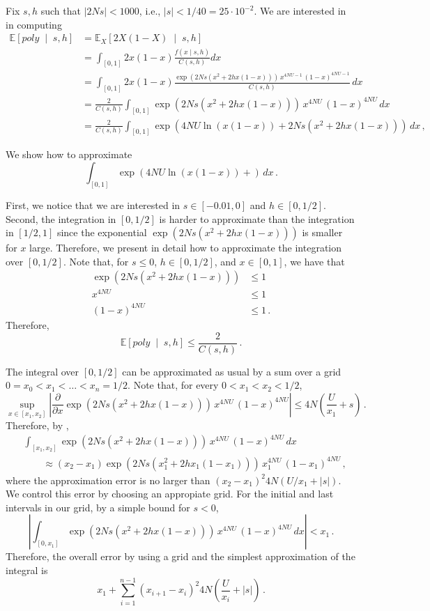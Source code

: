 \documentclass[a4paper,11pt]{article}
\newcommand{\EE}{\mathbb{E}}
\newcommand{\1}{\mathds{1}}
\newcommand{\cond}{\;\middle\vert\;}
\theoremstyle{plain} %
\theoremstyle{definition} %
\theoremstyle{remark} %
\begin{document}
Fix $s, h$ such that $|2Ns| < 1000$, i.e., $|s| < 1/40 = 25 \cdot 10^{-2}$. 
We are interested in in computing
\begin{align*}
	\EE \left[ poly \cond s, h \right] 
		&= \EE_X \left[ 2 X (1 - X) \cond s, h \right] \\
		&= \int_{[0, 1]} 2 x (1 - x) \frac{ f(x \mid s, h) }{ C(s, h) } dx \\
		&= \int_{[0, 1]}  2 x (1 - x) \frac{ \exp( 2 N s ( x^2 + 2h x(1-x) ) ) \, x^{4 N U - 1} \, (1 - x)^{4 N U - 1} }{ C(s, h) } \, dx \\
		&= \frac{2}{C(s, h)} \int_{[0, 1]}  \exp( 2 N s ( x^2 + 2h x(1-x)) ) \, x^{4 N U} \, (1 - x)^{4 N U} \, dx \\
		&= \frac{2}{C(s, h)} \int_{[0, 1]}  \exp( 4 N U \ln(x (1-x)) + 2 N s ( x^2 + 2h x(1-x)) ) \, dx \,,
\end{align*}

We show how to approximate
\[
	\int_{[0, 1]}  \exp( 4 N U \ln(x (1-x)) +  ) \, dx \,.
\]

First, we notice that we are interested in $s \in [-0.01, 0]$ and $h \in [0, 1/2]$.
Second, the integration in $[0, 1/2]$ is harder to approximate than the integration in $[1/2, 1]$ since the exponential $\exp(2 N s ( x^2 + 2h x(1-x)))$ is smaller for $x$ large.
Therefore, we present in detail how to approximate the integration over $[0, 1/2]$.
Note that, for $s \le 0$, $h \in [0, 1/2]$, and $x \in [0, 1]$, we have that
\begin{align*}
	\exp( 2 N s ( x^2 + 2h x(1-x))  )
		&\le 1 \\
	 x^{4 N U} 
	 	&\le 1 \\
 	(1 - x)^{4 N U} 
 		&\le 1 \,.
\end{align*}
Therefore,
\[
		\EE \left[ poly \cond s, h \right] 
			\le \frac{2}{C(s, h)} \,.
\]

The integral over $[0, 1/2]$ can be approximated as usual by a sum over a grid $0 = x_0 < x_1 < \ldots < x_n = 1/2$.
Note that, for every $0 < x_1 < x_2 < 1/2$, 
\[
	\sup_{x \in [x_1, x_2]}\left| \frac{\partial}{\partial x} \exp( 2 N s ( x^2 + 2h x(1-x)) ) \, x^{4 N U} \, (1 - x)^{4 N U} \right| 
		\le 4N \left( \frac{U}{x_1} + s \right) \,.
\]
Therefore, by , 
\begin{align*}
	&\int_{[x_1, x_2]}  \exp( 2 N s ( x^2 + 2h x(1-x)) ) \, x^{4 N U} \, (1 - x)^{4 N U} \, dx  \\
		&\qquad \approx (x_2 - x_1) \exp( 2 N s ( x_1^2 + 2 h x_1 (1 - x_1)) ) \, x_1^{4 N U} \, (1 - x_1)^{4 N U} \,,
\end{align*}
where the approximation error is no larger than $(x_2 - x_1)^2 4 N (U / x_1 + |s|)$. 
We control this error by choosing an appropiate grid.
For the initial and last intervals in our grid, by a simple bound for $s < 0$,
\[
	\left | \int_{[0, x_1]} \exp( 2 N s ( x^2 + 2h x(1-x)) ) \, x^{4 N U} \, (1 - x)^{4 N U} \, dx \right | 
		< x_1 \,.
\]
Therefore, the overall error by using a grid and the simplest approximation of the integral is
\[
	x_1 
		+ \sum_{i = 1}^{n - 1} (x_{i + 1} - x_i)^2 4 N  \left( \frac{U}{x_i} + |s| \right) \,.
\]
\end{document}
